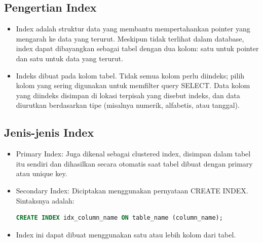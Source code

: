 \documentclass{article}
\begin{document}
\subsection{Pengertian Index}
\begin{itemize}
    \item Index adalah struktur data yang membantu mempertahankan pointer yang mengarah ke data yang terurut. Meskipun tidak terlihat dalam database, index dapat dibayangkan sebagai tabel dengan dua kolom: satu untuk pointer dan satu untuk data yang terurut.
    \item Indeks dibuat pada kolom tabel. Tidak semua kolom perlu diindeks; pilih kolom yang sering digunakan untuk memfilter query SELECT. Data kolom yang diindeks disimpan di lokasi terpisah yang disebut indeks, dan data diurutkan berdasarkan tipe (misalnya numerik, alfabetis, atau tanggal).
\end{itemize}

\subsection{Jenis-jenis Index}
\begin{itemize}
    \item Primary Index: Juga dikenal sebagai clustered index, disimpan dalam tabel itu sendiri dan dihasilkan secara otomatis saat tabel dibuat dengan primary atau unique key.
    \item Secondary Index: Diciptakan menggunakan pernyataan CREATE INDEX. Sintaksnya adalah:
          \begin{lstlisting}[language=SQL, caption={}, captionpos=b]
CREATE INDEX idx_column_name ON table_name (column_name);
\end{lstlisting}
    \item Index ini dapat dibuat menggunakan satu atau lebih kolom dari tabel.
\end{itemize}
\end{document}
